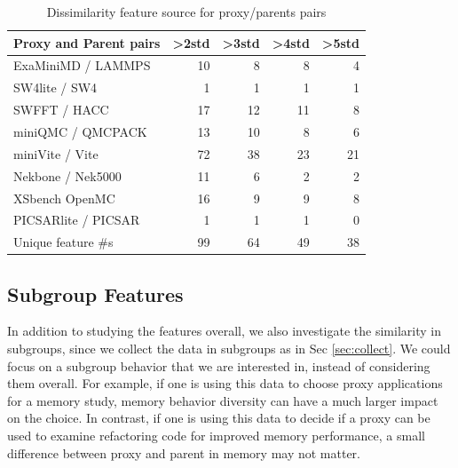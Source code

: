 \begin{table}[t]
\caption{Dissimilarity feature source for proxy/parents pairs}
\label{tab:Dissimilarity}
\centering
\begin{tabular}{lrrrr}%
\toprule
\textbf{Proxy and Parent pairs}               & \textbf{\textgreater{}2std} & \textbf{\textgreater{}3std} & \textbf{\textgreater{}4std} & \textbf{\textgreater{}5std} \\ \midrule
ExaMiniMD / LAMMPS                            & 10                          & 8                           & 8                           & 4                           \\ 
SW4lite / SW4                                 & 1                           & 1                           & 1                           & 1                           \\ 
SWFFT / HACC                                  & 17                          & 12                          & 11                          & 8                           \\ 
miniQMC / QMCPACK                             & 13                          & 10                          & 8                           & 6                           \\ 
miniVite / Vite                               & 72                          & 38                          & 23                          & 21                          \\ 
Nekbone / Nek5000                             & 11                          & 6                           & 2                           & 2                           \\ 
XSbench OpenMC                                & 16                          & 9                           & 9                           & 8                           \\ 
PICSARlite / PICSAR                           & 1                           & 1                           & 1                           & 0                           \\ 
Unique feature \#s & 99                          & 64                          & 49                          & 38                          \\ \bottomrule
\end{tabular}

\end{table}


\subsection{Subgroup Features}
\label{sec:subgroup}
In addition to studying the features overall, we also investigate the similarity in subgroups, since we collect the data in subgroups as in Sec \ref{sec:collect}. We could focus on a subgroup behavior that we are interested in, instead of considering them overall. 
For example, if one is using this data to choose proxy applications for a memory study, memory behavior diversity can have a much larger impact on the choice. In contrast, if one is using this data to decide if a proxy can be used to examine refactoring code for improved memory performance, a small difference between proxy and parent in memory may not matter. 

